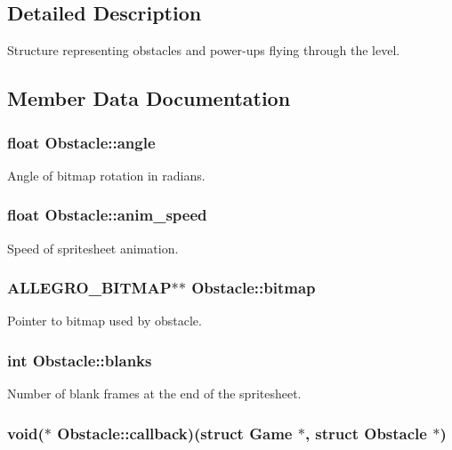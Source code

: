 \subsection{Detailed Description}
Structure representing obstacles and power-\/ups flying through the level. 

\subsection{Member Data Documentation}
\hypertarget{structObstacle_a99d85ef4e92f7e899b49ac85b2e1dbdc}{
\subsubsection[{angle}]{\setlength{\rightskip}{0pt plus 5cm}float Obstacle\-::angle}}\label{structObstacle_a99d85ef4e92f7e899b49ac85b2e1dbdc}
Angle of bitmap rotation in radians. \hypertarget{structObstacle_a96a13e4704e4643291989193a112366a}{
\subsubsection[{anim\-\_\-speed}]{\setlength{\rightskip}{0pt plus 5cm}float Obstacle\-::anim\-\_\-speed}}\label{structObstacle_a96a13e4704e4643291989193a112366a}
Speed of spritesheet animation. \hypertarget{structObstacle_a1f35f88fe8f6d0664da082f82ae4b774}{
\subsubsection[{bitmap}]{\setlength{\rightskip}{0pt plus 5cm}A\-L\-L\-E\-G\-R\-O\-\_\-\-B\-I\-T\-M\-A\-P$\ast$$\ast$ Obstacle\-::bitmap}}\label{structObstacle_a1f35f88fe8f6d0664da082f82ae4b774}
Pointer to bitmap used by obstacle. \hypertarget{structObstacle_a862f4038bd63057d91406720bb586a9c}{
\subsubsection[{blanks}]{\setlength{\rightskip}{0pt plus 5cm}int Obstacle\-::blanks}}\label{structObstacle_a862f4038bd63057d91406720bb586a9c}
Number of blank frames at the end of the spritesheet. \hypertarget{structObstacle_a21b4ff0edaa2dc5394ff7a6328e48358}{
\subsubsection[{callback}]{\setlength{\rightskip}{0pt plus 5cm}void($\ast$ Obstacle\-::callback)(struct {\bf Game} $\ast$, struct {\bf Obstacle} $\ast$)}}\label{structObstacle_a21b4ff0edaa2dc5394ff7a6328e48358}
